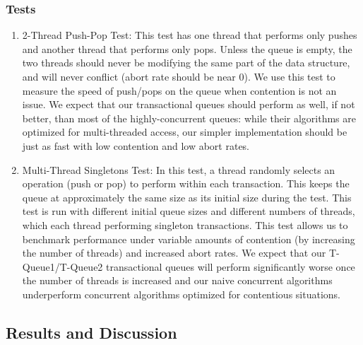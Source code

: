 \subsubsection{Tests}
\begin{enumerate}
\item 2-Thread Push-Pop Test: This test has one thread that performs only pushes and another thread that performs only pops. Unless the queue is empty, the two threads should never be modifying the same part of the data structure, and will never conflict (abort rate should be near 0). We use this test to measure the speed of push/pops on the queue when contention is not an issue. We expect that our transactional queues should perform as well, if not better, than most of the highly-concurrent queues: while their algorithms are optimized for multi-threaded access, our simpler implementation should be just as fast with low contention and low abort rates.

\item Multi-Thread Singletons Test: 
    In this test, a thread randomly selects an operation (push or pop) to perform within each transaction. This keeps the queue at approximately the same size as its initial size during the test. This test is run with different initial queue sizes and different numbers of threads, which each thread performing singleton transactions. This test allows us to benchmark performance under variable amounts of contention (by increasing the number of threads) and increased abort rates. We expect that our T-Queue1/T-Queue2 transactional queues will perform significantly worse once the number of threads is increased and our naive concurrent algorithms underperform concurrent algorithms optimized for contentious situations.
    
    
\end{enumerate}

\subsection{Results and Discussion}

